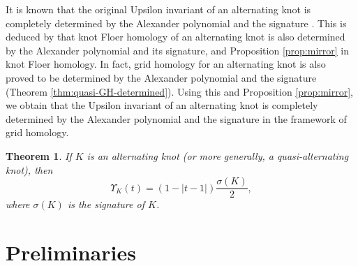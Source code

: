 \documentclass[12pt]{amsart}
\theoremstyle{plain}
\newtheorem{thm}{Theorem}[section]
\theoremstyle{definition}
\theoremstyle{plain}
\theoremstyle{definition}
\numberwithin{equation}{section}
\begin{document}
It is known that the original Upsilon invariant of an alternating knot is completely determined by the Alexander polynomial and the signature \cite[Theorem 1.14]{Concordance-homomorphisms-from-knot-Floer-homology}.
This is deduced by that knot Floer homology of an alternating knot is also determined by the Alexander polynomial and its signature, and Proposition \ref{prop:mirror} in knot Floer homology.
In fact, grid homology for an alternating knot is also proved to be determined by the Alexander polynomial and the signature (Theorem \ref{thm:quasi-GH-determined}).
Using this and Proposition \ref{prop:mirror}, we obtain that the Upsilon invariant of an alternating knot is completely determined by the Alexander polynomial and the signature in the framework of grid homology.

\begin{thm}
\label{thm:quasi-alt}
If $K$ is an alternating knot (or more generally, a quasi-alternating knot), then
\[
\Upsilon_K(t)=(1-|t-1|)\frac{\sigma(K)}{2},
\]
where $\sigma(K)$ is the signature of $K$.
\end{thm}



\section{Preliminaries}
\end{document}
